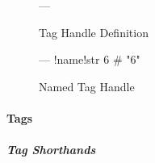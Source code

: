 \begin{figure}[H]
  \begin{minipage}[t]{0.48\textwidth}
    \vspace{0pt}
    \begin{bchart}[max=9, width=0.85\textwidth]
    \end{bchart}
  \end{minipage}
  \begin{minipage}[t]{0.48\textwidth}
    \vspace{0pt}
    \begin{yamlcode}
      ---
    \end{yamlcode}
  \end{minipage}
  \caption{Tag Handle Definition}
\end{figure}

\begin{figure}[H]
  \begin{minipage}[t]{0.48\textwidth}
    \vspace{0pt}
    \begin{bchart}[max=9, width=0.85\textwidth]
    \end{bchart}
  \end{minipage}
  \begin{minipage}[t]{0.48\textwidth}
    \vspace{0pt}
    \begin{yamlcode}
      ---
      !name!str 6 # "6"
    \end{yamlcode}
  \end{minipage}
  \caption{Named Tag Handle}
\end{figure}

\paragraph{Tags}

\subparagraph{Tag Shorthands}

